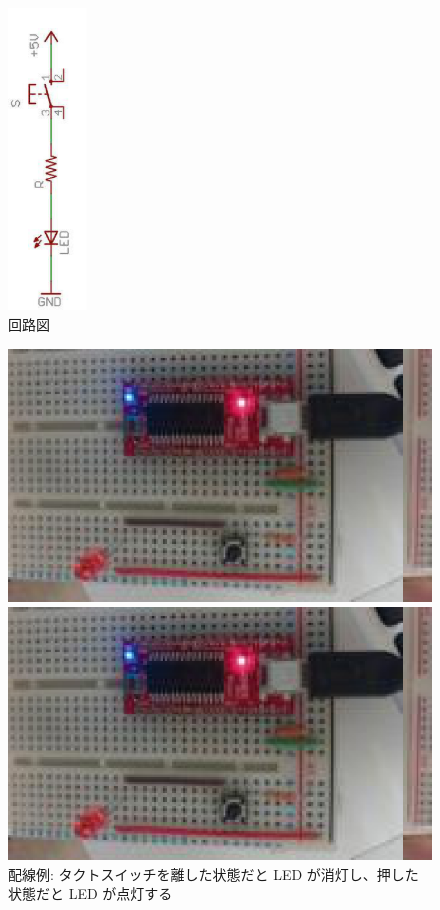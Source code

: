 \documentclass[11pt,a4paper]{jarticle}
\begin{document}
\begin{figure}
 \centering
 \includegraphics[height=80mm]{img/circuit.eps}
 \caption{回路図}
\end{figure}

\begin{figure}
 \begin{minipage}{0.5\columnwidth}
  \centering
  \includegraphics[width=0.8\columnwidth]{img/release_switch.eps}
 \end{minipage}
 \begin{minipage}{0.5\columnwidth}
  \centering
  \includegraphics[width=0.8\columnwidth]{img/push_switch.eps}
 \end{minipage}
 \caption{配線例: タクトスイッチを離した状態だと LED が消灯し、押した状態だと LED が点灯する}
\end{figure}
\end{document}
